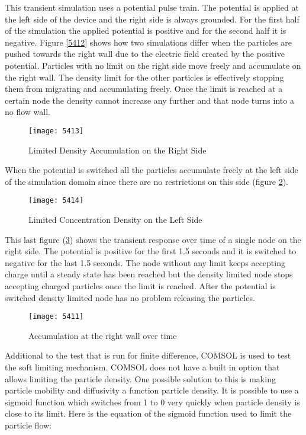 \begin{doublespace}
This transient simulation uses a potential pulse train. The potential is applied at the left side of the device and the right side is always grounded. For the first half of the simulation the applied potential is positive and for the second half it is negative. Figure \ref{5412} shows how two simulations differ when the particles are pushed towards the right wall due to the electric field created by the positive potential. Particles with no limit on the right side move freely and accumulate on the right wall. The density limit for the other particles is effectively stopping them from migrating and accumulating freely. Once the limit is reached at a certain node the density cannot increase any further and that node turns into a no flow wall. 

\begin{figure}[!htp]
\centering
\texttt{[image: 5413]}
\caption{Limited Density Accumulation on the Right Side} 
\label{5413}
\end{figure}

When the potential is switched all the particles accumulate freely at the left side of the simulation domain since there are no restrictions on this side (figure \ref{5414}).

\begin{figure}[!htp]
\centering
\texttt{[image: 5414]}
\caption{Limited Concentration Density on the Left Side} 
\label{5414}
\end{figure}

This last figure (\ref{5411}) shows the transient response over time of a single node on the right side. The potential is positive for the first 1.5 seconds and it is switched to negative for the last 1.5 seconds. The node without any limit keeps accepting charge until a steady state has been reached but the density limited node stops accepting charged particles once the limit is reached. After the potential is switched density limited node has no problem releasing the particles.


\begin{figure}[!htp]
\centering
\texttt{[image: 5411]}
\caption{Accumulation at the right wall over time} 
\label{5411}
\end{figure}

Additional to the test that is run for finite difference, COMSOL is used to test the soft limiting mechanism. COMSOL does not have a built in option that allows limiting the particle density. One possible solution to this is making particle mobility and diffusivity a function particle density. It is possible to use a sigmoid function which switches from 1 to 0 very quickly when particle density is close to its limit. Here is the equation of the sigmoid function used to limit the particle flow:


\end{doublespace}
